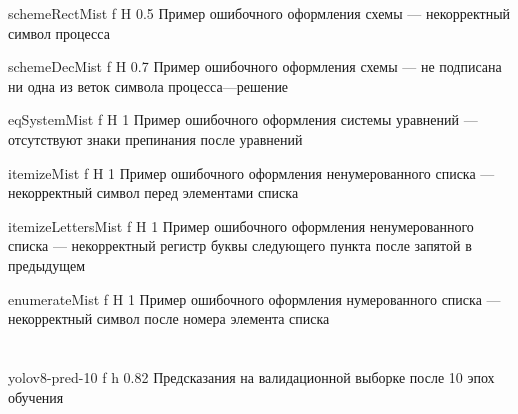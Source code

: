 \begin{appendices}
{schemeRectMist} %
{f} %
{H} %
{0.5\textwidth} %
{Пример ошибочного оформления схемы --- некорректный символ процесса} %

{schemeDecMist} %
{f} %
{H} %
{0.7\textwidth} %
{Пример ошибочного оформления схемы --- не подписана ни одна из веток символа процесса---решение} %

{eqSystemMist} %
{f} %
{H} %
{1\textwidth} %
{Пример ошибочного оформления системы уравнений --- отсутствуют знаки препинания после уравнений} %

{itemizeMist} %
{f} %
{H} %
{1\textwidth} %
{Пример ошибочного оформления ненумерованного списка --- некорректный символ перед элементами списка} %

{itemizeLettersMist} %
{f} %
{H} %
{1\textwidth} %
{Пример ошибочного оформления ненумерованного списка --- некорректный регистр буквы следующего пункта после запятой в предыдущем} %

{enumerateMist} %
{f} %
{H} %
{1\textwidth} %
{Пример ошибочного оформления нумерованного списка --- некорректный символ после номера элемента списка} %



\chapter{}
{yolov8-pred-10} %
{f} %
{h} %
{0.82\textwidth} %
{Предсказания на валидационной выборке после 10 эпох обучения} %



\end{appendices}
